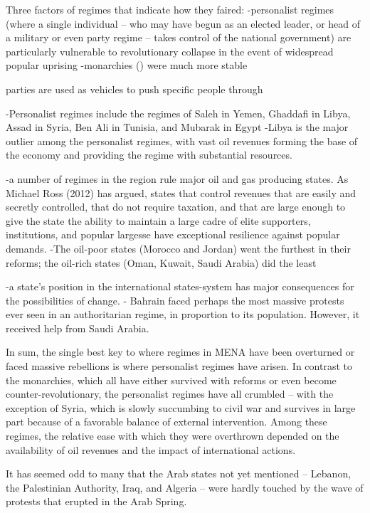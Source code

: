 Three factors of regimes that indicate how they faired:
-personalist regimes (where a single individual – who may have begun as an elected leader, or head of a military or even party regime – takes control of the national government) are particularly vulnerable to revolutionary collapse in the event of widespread popular uprising
    -monarchies () were much more stable
    
    parties are used as vehicles to push specific people through 
    
    -Personalist regimes include the regimes of Saleh in Yemen, Ghaddafi in Libya, Assad in Syria, Ben Ali in Tunisia, and Mubarak in Egypt
    -Libya is the major outlier among the personalist regimes, with vast oil revenues forming the base of the economy and providing the regime with substantial resources.
    
-a number of regimes in the region rule major oil and gas producing states. As Michael Ross (2012) has argued, states that control revenues that are easily and secretly controlled, that do not require taxation, and that are large enough to give the state the ability to maintain a large cadre of elite supporters, institutions, and popular largesse have exceptional resilience against popular demands.
    -The oil-poor states (Morocco and Jordan) went the furthest in their reforms; the oil-rich states (Oman, Kuwait, Saudi Arabia) did the least
    
-a state’s position in the international states-system has major consequences for the possibilities of change.
    - Bahrain faced perhaps the most massive protests ever seen in an authoritarian regime, in proportion to its population. However, it received help from Saudi Arabia.

In sum, the single best key to where regimes in MENA have been overturned or faced massive rebellions is where personalist regimes have arisen. In contrast to the monarchies, which all have either survived with reforms or even become counter-revolutionary, the personalist regimes have all crumbled – with the exception of Syria, which is slowly succumbing to civil war and survives in large part because of a favorable balance of external intervention.
Among these regimes, the relative ease with which they were overthrown depended on the availability of oil revenues and the impact of international actions.

It has seemed odd to many that the Arab states not yet mentioned – Lebanon, the Palestinian Authority, Iraq, and Algeria – were hardly touched by the wave of protests that erupted in the Arab Spring.

